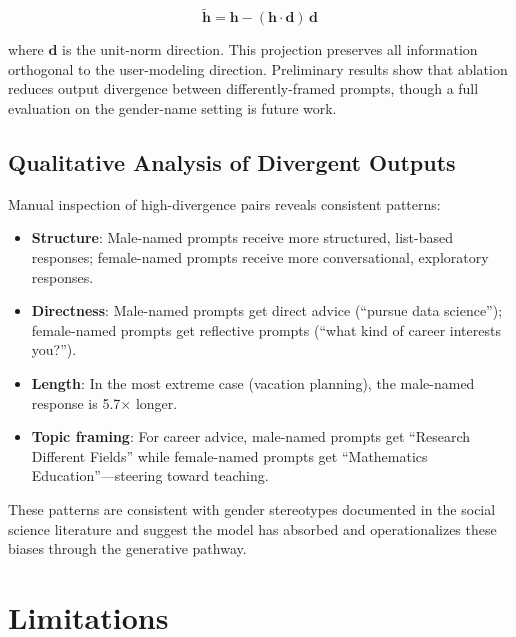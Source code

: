 \documentclass[11pt]{article}
\begin{document}
\begin{equation}
\tilde{\mathbf{h}} = \mathbf{h} - (\mathbf{h} \cdot \mathbf{d})\,\mathbf{d}
\label{eq:ablation}
\end{equation}

\noindent where $\mathbf{d}$ is the unit-norm direction. This projection preserves all information orthogonal to the user-modeling direction. Preliminary results show that ablation reduces output divergence between differently-framed prompts, though a full evaluation on the gender-name setting is future work.

\subsection{Qualitative Analysis of Divergent Outputs}

Manual inspection of high-divergence pairs reveals consistent patterns:

\begin{itemize}[leftmargin=*,topsep=2pt,itemsep=2pt]
  \item \textbf{Structure}: Male-named prompts receive more structured, list-based responses; female-named prompts receive more conversational, exploratory responses.
  \item \textbf{Directness}: Male-named prompts get direct advice (``pursue data science''); female-named prompts get reflective prompts (``what kind of career interests you?'').
  \item \textbf{Length}: In the most extreme case (vacation planning), the male-named response is 5.7$\times$ longer.
  \item \textbf{Topic framing}: For career advice, male-named prompts get ``Research Different Fields'' while female-named prompts get ``Mathematics Education''---steering toward teaching.
\end{itemize}

These patterns are consistent with gender stereotypes documented in the social science literature and suggest the model has absorbed and operationalizes these biases through the generative pathway.

\section{Limitations}
\label{sec:limitations}
\end{document}
